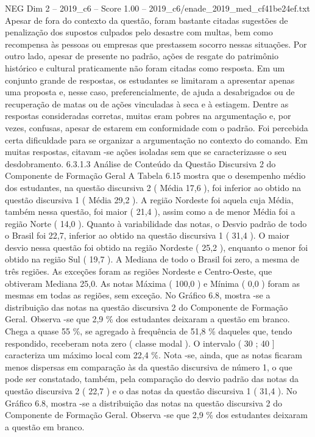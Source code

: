 \begin{textsample}{NEG Dim 2 – 2019\_c6 – Score 1.00 – 2019\_c6/enade\_2019\_med\_cf41be24ef.txt}
Apesar de fora do contexto da questão, foram bastante citadas sugestões de penalização dos supostos culpados pelo desastre com multas, bem como recompensa às pessoas ou empresas que prestassem socorro nessas situações.
Por outro lado, apesar de presente no padrão, ações de resgate do patrimônio histórico e cultural praticamente não foram citadas como resposta.
Em um conjunto grande de respostas, os estudantes se limitaram a apresentar apenas uma proposta e, nesse caso, preferencialmente, de ajuda a desabrigados ou de recuperação de matas ou de ações vinculadas à seca e à estiagem.
Dentre as respostas consideradas corretas, muitas eram pobres na argumentação e, por vezes, confusas, apesar de estarem em conformidade com o padrão.
Foi percebida certa dificuldade para se organizar a argumentação no contexto do comando.
Em muitas respostas, citavam -se ações isoladas sem que se caracterizasse o seu desdobramento. 6.3.1.3 Análise de Conteúdo da Questão Discursiva 2 do Componente de Formação Geral A Tabela 6.15 mostra que o desempenho médio dos estudantes, na questão discursiva 2 ( Média 17,6 ), foi inferior ao obtido na questão discursiva 1 ( Média 29,2 ).
A região Nordeste foi aquela cuja Média, também nessa questão, foi maior ( 21,4 ), assim como a de menor Média foi a região Norte ( 14,0 ).
Quanto à variabilidade das notas, o Desvio padrão de todo o Brasil foi 22,7, inferior ao obtido na questão discursiva 1 ( 31,4 ).
O maior desvio nessa questão foi obtido na região Nordeste ( 25,2 ), enquanto o menor foi obtido na região Sul ( 19,7 ).
A Mediana de todo o Brasil foi zero, a mesma de três regiões.
As exceções foram as regiões Nordeste e Centro-Oeste, que obtiveram Mediana 25,0.
As notas Máxima ( 100,0 ) e Mínima ( 0,0 ) foram as mesmas em todas as regiões, sem exceção.
No Gráfico 6.8, mostra -se a distribuição das notas na questão discursiva 2 do Componente de Formação Geral.
Observa -se que 2,9 \% dos estudantes deixaram a questão em branco.
Chega a quase 55 \%, se agregado à frequência de 51,8 \% daqueles que, tendo respondido, receberam nota zero ( classe modal ).
O intervalo ( 30 ; 40 ] caracteriza um máximo local com 22,4 \%.
Nota -se, ainda, que as notas ficaram menos dispersas em comparação às da questão discursiva de número 1, o que pode ser constatado, também, pela comparação do desvio padrão das notas da questão discursiva 2 ( 22,7 ) e o das notas da questão discursiva 1 ( 31,4 ).
No Gráfico 6.8, mostra -se a distribuição das notas na questão discursiva 2 do Componente de Formação Geral.
Observa -se que 2,9 \% dos estudantes deixaram a questão em branco.

\end{textsample}
